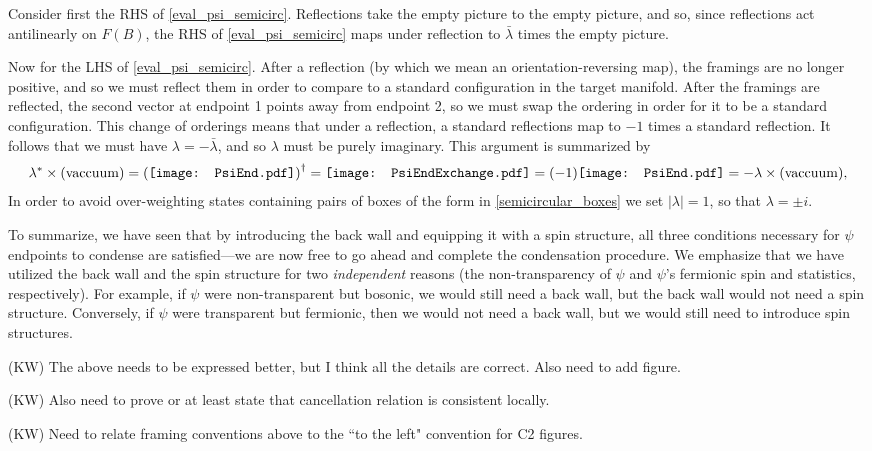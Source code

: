 \documentclass[12pt,a4paper]{article}
\newcommand{\kw}[1]{{\color{kwcolor}\footnotesize{(KW) #1}}}
\newcommand{\PsiEnd}{\mathord{\vcenter{\hbox{\texttt{[image: PsiEnd.pdf]}}}}}
\newcommand{\PsiEndExchange}{\mathord{\vcenter{\hbox{\texttt{[image: PsiEndExchange.pdf]}}}}}
\begin{document}
Consider first the RHS of \eqref{eval_psi_semicirc}. 
Reflections take the empty picture to the empty picture, and so, since reflections act antilinearly on $F(B)$,
the RHS of \eqref{eval_psi_semicirc} maps under reflection to $\bar\lambda$ times the empty picture.

Now for the LHS of \eqref{eval_psi_semicirc}.
After a reflection (by which we mean an orientation-reversing map), 
the framings are no longer positive, and so we must reflect them in order to compare to a standard configuration
in the target manifold.
After the framings are reflected, the second vector at endpoint 1 points away from endpoint 2,
so we must swap the ordering in order for it to be a standard configuration.
This change of orderings means that under a reflection, a standard reflections map to $-1$ times a standard
reflection.
It follows that we must have $\lambda = -\bar\lambda$, and so $\lambda$ must be purely imaginary.
This argument is summarized by 
\begin{align}
\lambda^{*} \times ({\rm vaccuum}) = \left( \PsiEnd \right) ^{\dagger}  = \PsiEndExchange = (-1) \PsiEnd  = - \lambda \times ({\rm vaccuum}),
\label{phase}
\end{align}
In order to avoid over-weighting states containing pairs of boxes 
of the form in \eqref{semicircular_boxes} we set 
$|\lambda|=1$, so that $\lambda = \pm i$. 

To summarize, we have seen that by introducing the back wall and equipping it with a spin structure, all three 
conditions necessary for $\psi$ endpoints to condense are satisfied---we are now free to go ahead and 
complete the condensation procedure. 
We emphasize that we have utilized the back wall and the spin structure for two {\it independent} reasons 
(the non-transparency of $\psi$ and $\psi$'s fermionic spin and statistics, respectively). 
For example, if $\psi$ were non-transparent but bosonic, we would still need a back wall, but the back wall 
would not need a spin structure.
Conversely, if $\psi$ were transparent but fermionic, then we would not need a back wall, but we would still 
need to introduce spin
structures.



\kw{The above needs to be expressed better, but I think all the details are correct.
Also need to add figure.}

\kw{Also need to prove or at least state that cancellation relation is consistent locally.}

\kw{Need to relate framing conventions above to the ``to the left" convention for C2 figures.}
\end{document}
